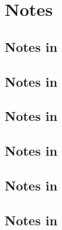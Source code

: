 



\chapter{Notes}\label{Notes}


\section{Notes in \msr{}}


\section{Notes in \mxsrToMsr{}}


\section{Notes in \mxsrToMsr{}}


\section{Notes in \msrToMsr{}}


\section{Notes in \msrToLpsr{}}


\section{Notes in \lpsrToLilypond{}}


